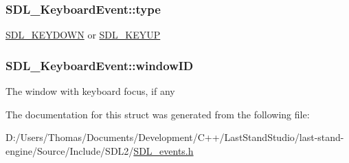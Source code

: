 \subsubsection[{type}]{ S\+D\+L\+\_\+\+Keyboard\+Event\+::type}\label{structSDL__KeyboardEvent_ae0b2f2aace6f80c1f47e5a14350d409a}
\hyperlink{SDL__events_8h_a3b589e89be6b35c02e0dd34a55f3fccaacaf8cfd53c985cdbf6a90c811d51a1fc}{S\+D\+L\+\_\+\+K\+E\+Y\+D\+O\+W\+N} or \hyperlink{SDL__events_8h_a3b589e89be6b35c02e0dd34a55f3fccaadefb8866b9d28be21c2c33c35cc66c4b}{S\+D\+L\+\_\+\+K\+E\+Y\+U\+P} \hypertarget{structSDL__KeyboardEvent_a56efb6780b96acd5b50d8f797efb3546}{}
\subsubsection[{window\+I\+D}]{ S\+D\+L\+\_\+\+Keyboard\+Event\+::window\+I\+D}\label{structSDL__KeyboardEvent_a56efb6780b96acd5b50d8f797efb3546}
The window with keyboard focus, if any 

The documentation for this struct was generated from the following file\+:\begin{DoxyCompactItemize}
\item 
D\+:/\+Users/\+Thomas/\+Documents/\+Development/\+C++/\+Last\+Stand\+Studio/last-\/stand-\/engine/\+Source/\+Include/\+S\+D\+L2/\hyperlink{SDL__events_8h}{S\+D\+L\+\_\+events.\+h}\end{DoxyCompactItemize}
